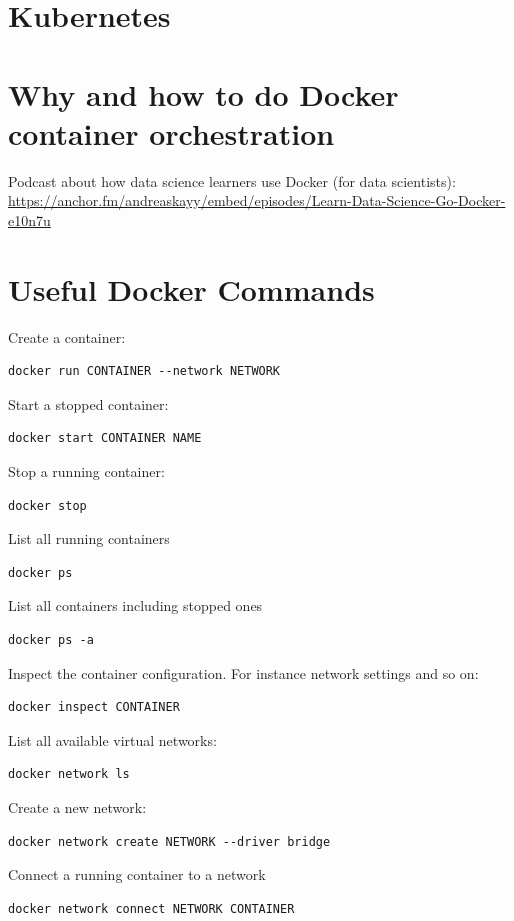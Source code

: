 \documentclass[12pt, numbers=noenddot]{scrreprt} %
\begin{document}
\section{Kubernetes}
\section{Why and how to do Docker container orchestration}
Podcast about how data science learners use Docker (for data scientists): \url{https://anchor.fm/andreaskayy/embed/episodes/Learn-Data-Science-Go-Docker-e10n7u}

\section{Useful Docker Commands}

Create a container:
\begin{lstlisting}
docker run CONTAINER --network NETWORK
\end{lstlisting}

Start a stopped container:
\begin{lstlisting}
docker start CONTAINER NAME
\end{lstlisting}

Stop a running container:
\begin{lstlisting}
docker stop
\end{lstlisting}

List all running containers
\begin{lstlisting}
docker ps
\end{lstlisting}

List all containers including stopped ones
\begin{lstlisting}
docker ps -a
\end{lstlisting}

Inspect the container configuration. For instance network settings and so on:
\begin{lstlisting}
docker inspect CONTAINER
\end{lstlisting}

List all available virtual networks:
\begin{lstlisting}
docker network ls
\end{lstlisting}

Create a new network:
\begin{lstlisting}
docker network create NETWORK --driver bridge
\end{lstlisting}

Connect a running container to a network
\begin{lstlisting}
docker network connect NETWORK CONTAINER
\end{lstlisting}
\end{document}
